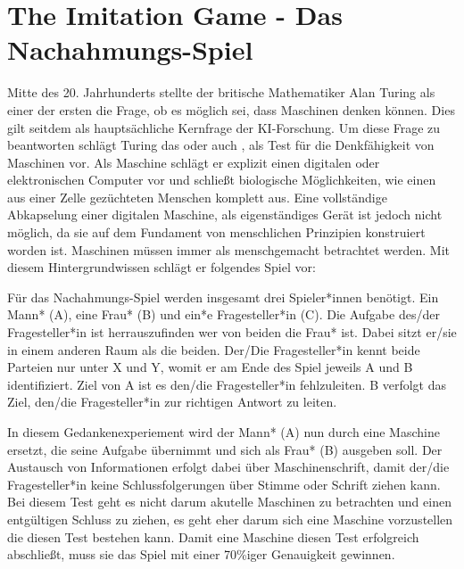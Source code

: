 \documentclass[12pt,german,ngerman]{report}
\begin{document}
    \section{The Imitation Game - Das Nachahmungs-Spiel}
        Mitte des 20. Jahrhunderts stellte der britische Mathematiker Alan Turing als einer der ersten
        die Frage, ob es möglich sei, dass Maschinen denken können. Dies gilt seitdem als hauptsächliche
        Kernfrage der KI-Forschung. Um diese Frage zu beantworten schlägt Turing das  oder
        auch , als Test für die Denkfähigkeit von Maschinen vor. Als Maschine schlägt er
        explizit einen digitalen oder elektronischen Computer vor und schließt biologische Möglichkeiten,
        wie einen aus einer Zelle gezüchteten Menschen komplett aus.\cite[435]{turing1950computing}
        Eine vollständige Abkapselung einer digitalen Maschine, als eigenständiges Gerät ist jedoch nicht möglich, da sie auf dem
        Fundament von menschlichen Prinzipien konstruiert worden ist. Maschinen müssen immer als menschgemacht betrachtet werden.
        Mit diesem Hintergrundwissen schlägt er folgendes Spiel vor:
        \begin{displayquote}
            Für das Nachahmungs-Spiel werden insgesamt drei Spieler*innen benötigt. Ein Mann* (A), eine Frau* (B) und ein*e
            Fragesteller*in (C). Die Aufgabe des/der Fragesteller*in ist herrauszufinden wer von beiden die Frau* ist.
            Dabei sitzt er/sie in einem anderen Raum als die beiden. Der/Die Fragesteller*in kennt beide Parteien
            nur unter X und Y, womit er am Ende des Spiel jeweils A und B identifiziert. Ziel von A ist es den/die Fragesteller*in
            fehlzuleiten. B verfolgt das Ziel, den/die Fragesteller*in zur richtigen Antwort zu leiten.
            \cite[433]{turing1950computing}
        \end{displayquote}
        In diesem Gedankenexperiement wird der Mann* (A) nun durch eine Maschine ersetzt, die seine Aufgabe übernimmt und
        sich als Frau* (B) ausgeben soll. Der Austausch von Informationen erfolgt dabei über Maschinenschrift, damit
        der/die Fragesteller*in keine Schlussfolgerungen über Stimme oder Schrift ziehen kann.\cite[433]{turing1950computing}
        Bei diesem Test geht es nicht darum akutelle Maschinen zu betrachten und einen entgültigen Schluss zu ziehen, es geht
        eher darum sich eine Maschine vorzustellen die diesen Test bestehen kann.
        Damit eine Maschine diesen Test erfolgreich abschließt,
        muss sie das Spiel mit einer 70\%iger Genauigkeit gewinnen.\cite[1]{oppy&dowe2020turingtest}
        
\end{document}
